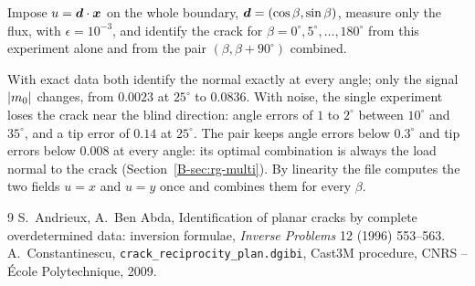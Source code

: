 \label{exo:cc-rg-rotation}
%
Impose $u=\bm{d}\cdot\bm{x}$ on the whole boundary, $\bm{d}=(\cos\beta,\sin\beta)$,
measure only the flux, with $\epsilon=10^{-3}$, and identify the crack for
$\beta=0^\circ,5^\circ,\dots,180^\circ$ from this experiment alone and from the
pair $(\beta,\beta+90^\circ)$ combined.
\begin{solution}
With exact data both identify the normal exactly at every angle; only the
signal $\lvert m_0\rvert$ changes, from $0.0023$ at $25^\circ$ to $0.0836$. With noise,
the single experiment loses the crack near the blind direction: angle errors
of $1$ to $2^\circ$ between $10^\circ$ and $35^\circ$, and a tip error of $0.14$ at
$25^\circ$. The pair keeps angle errors below $0.3^\circ$ and tip errors below
$0.008$ at every angle: its optimal combination is always the load normal to the
crack (Section~\ref{B-sec:rg-multi}). By linearity the file computes the two
fields $u=x$ and $u=y$ once and combines them for every $\beta$.

\end{solution}

\begin{chapterbib}{9}
 S.~Andrieux, A.~Ben Abda, Identification of planar cracks by
  complete overdetermined data: inversion formulae, \emph{Inverse Problems} 12
  (1996) 553--563.
 A.~Constantinescu, \texttt{crack\_reciprocity\_plan.dgibi},
  Cast3M procedure, CNRS -- \'Ecole Polytechnique, 2009.
\end{chapterbib}
